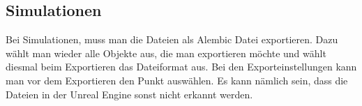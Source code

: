 \subsection{Simulationen}
Bei Simulationen, muss man die Dateien als Alembic Datei exportieren. Dazu wählt man wieder alle Objekte aus, die man exportieren möchte und
wählt diesmal beim Exportieren das Dateiformat  aus. Bei den Exporteinstellungen kann man vor dem Exportieren den Punkt  auswählen.
Es kann nämlich sein, dass die Dateien in der Unreal Engine sonst nicht erkannt werden.
